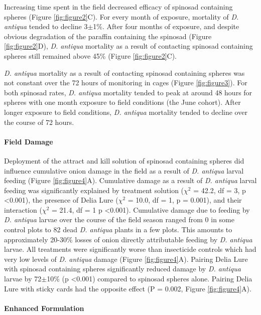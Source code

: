 \documentclass[alpha-refs]{wiley-article}
\begin{document}
Increasing time spent in the field decreased efficacy of spinosad containing spheres (Figure \ref{fig:figure2}C).  For every month of exposure, mortality of \textit{D. antiqua} tended to decline 3$\pm$1\%.  After four months of exposure, and despite obvious degradation of the paraffin containing the spinosad (Figure \ref{fig:figure2}D), \textit{D. antiqua} mortality as a result of contacting spinosad containing spheres still remained above 45\% (Figure \ref{fig:figure2}C).  

\textit{D. antiqua} mortality as a result of contacting spinosad containing spheres was not constant over the 72 hours of monitoring in cages (Figure \ref{fig:figure3}).  For both spinosad rates, \textit{D. antiqua} mortality tended to peak at around 48 hours for spheres with one month exposure to field conditions (the June cohort).  After longer exposure to field conditions, \textit{D. antiqua} mortality tended to decline over the course of 72 hours.  

\paragraph{Field Damage}

Deployment of the attract and kill solution of spinosad containing spheres did influence cumulative onion damage in the field as a result of \textit{D. antiqua} larval feeding (Figure \ref{fig:figure4}A).  Cumulative damage as a result of \textit{D. antiqua} larval feeding was significantly explained by treatment solution ($\chi^2$ = 42.2, df = 3, p \textless 0.001), the presence of Delia Lure ($\chi^2$ = 10.0, df = 1, p = 0.001), and their interaction ($\chi^2$ = 21.4, df = 1 p \textless 0.001).  Cumulative damage due to feeding by \textit{D. antiqua} larvae over the course of the field season ranged from 0 in some control plots to 82 dead \textit{D. antiqua} plants in a few plots. This amounts to approximately 20-30\% losses of onion directly attributable feeding by \textit{D. antiqua} larvae.  All treatments were significantly worse than insecticide controls which had very low levels of \textit{D. antiqua} damage (Figure \ref{fig:figure4}A).  Pairing Delia Lure with spinosad containing spheres significantly reduced damage by \textit{D. antiqua} larvae by 72$\pm$10\% (p \textless 0.001) compared to spinosad spheres alone.  Pairing Delia Lure with sticky cards had the opposite effect (P = 0.002, Figure \ref{fig:figure4}A).

\paragraph{Enhanced Formulation}
\end{document}
